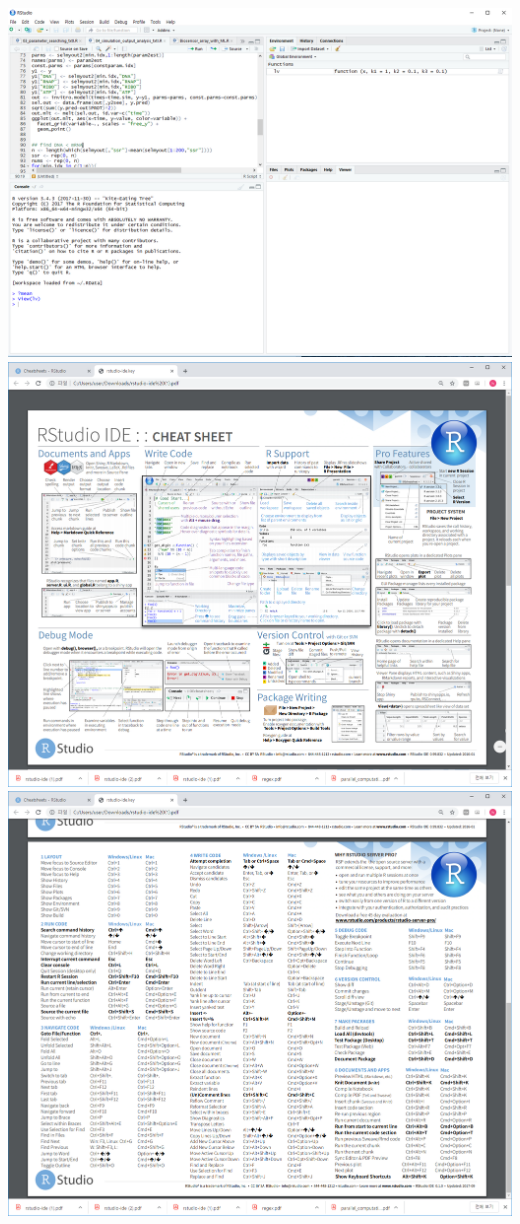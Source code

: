\documentclass[
]{book}
\begin{document}
\includegraphics{images/01/01-17.PNG}
\includegraphics{images/01/rstudio-ide-1.png}
\includegraphics{images/01/rstudio-ide-2.png}
\end{document}
